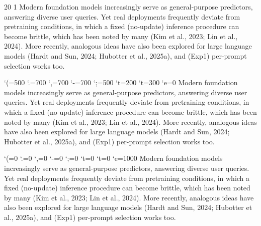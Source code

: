 \documentclass{article}
\begin{document}
 
\expandglyphsinfont{} 20 1
\newcommand{\para}{Modern foundation models increasingly serve as general-purpose predictors, answering
diverse user queries. Yet real deployments frequently deviate from pretraining conditions, in which a
fixed (no-update) inference procedure can become brittle, which has been noted by many (Kim et al.,
2023; Lin et al., 2024). More recently, analogous ideas have also been explored for large language
models (Hardt and Sun, 2024; Hubotter et al., 2025a), and (Exp1) per-prompt selection works too.\par}
\para
\lpcode\font`(=500 \rpcode\font`.=700 \rpcode\font`,=700 \rpcode\font`-=700 \rpcode\font`;=500
\lpcode\font`t=200 \rpcode\font`t=300 \efcode\font`e=0
\para
\lpcode\font`(=0 \rpcode\font`.=0 \rpcode\font`,=0 \rpcode\font`-=0 \rpcode\font`;=0
\lpcode\font`t=0 \rpcode\font`t=0 \efcode\font`e=1000
\para
\end{document}

